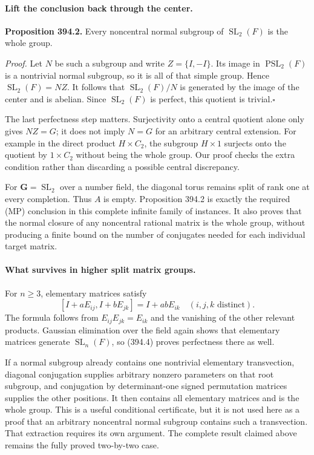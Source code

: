 \documentclass[11pt]{article}
\begin{document}
\paragraph{Lift the conclusion back through the center.}
\textbf{Proposition 394.2.} Every noncentral normal subgroup of
$\operatorname{SL}_2(F)$ is the whole group.

\emph{Proof.} Let $N$ be such a subgroup and write $Z=\{I,-I\}$.
Its image in $\operatorname{PSL}_2(F)$ is a nontrivial normal subgroup,
so it is all of that simple group. Hence
$\operatorname{SL}_2(F)=NZ$. It follows that
$\operatorname{SL}_2(F)/N$ is generated by the image of the center
and is abelian. Since $\operatorname{SL}_2(F)$ is perfect, this quotient
is trivial.\hfill$\square$

The last perfectness step matters. Surjectivity onto a central quotient
alone only gives $NZ=G$; it does not imply $N=G$ for an arbitrary
central extension. For example in the direct product $H\times C_2$,
the subgroup $H\times1$ surjects onto the quotient by $1\times C_2$
without being the whole group. Our proof checks the extra condition
rather than discarding a possible central discrepancy.

For $\mathbf G=\operatorname{SL}_2$ over a number field, the diagonal
torus remains split of rank one at every completion. Thus $A$ is empty.
Proposition 394.2 is exactly the required (MP) conclusion in this
complete infinite family of instances. It also proves that the normal
closure of any noncentral rational matrix is the whole group, without
producing a finite bound on the number of conjugates needed for each
individual target matrix.

\paragraph{What survives in higher split matrix groups.}
For $n\ge3$, elementary matrices satisfy
\[
 [I+aE_{ij},I+bE_{jk}]=I+abE_{ik}
 \quad(i,j,k\text{ distinct}).
 \tag{394.4}
\]
The formula follows from $E_{ij}E_{jk}=E_{ik}$ and the vanishing of
the other relevant products. Gaussian elimination over the field again
shows that elementary matrices generate $\operatorname{SL}_n(F)$,
so (394.4) proves perfectness there as well.

If a normal subgroup already contains one nontrivial elementary
transvection, diagonal conjugation supplies arbitrary nonzero parameters
on that root subgroup, and conjugation by determinant-one signed
permutation matrices supplies the other positions. It then contains
all elementary matrices and is the whole group. This is a useful
conditional certificate, but it is not used here as a proof that an
arbitrary noncentral normal subgroup contains such a transvection.
That extraction requires its own argument. The complete result claimed
above remains the fully proved two-by-two case.
\end{document}
